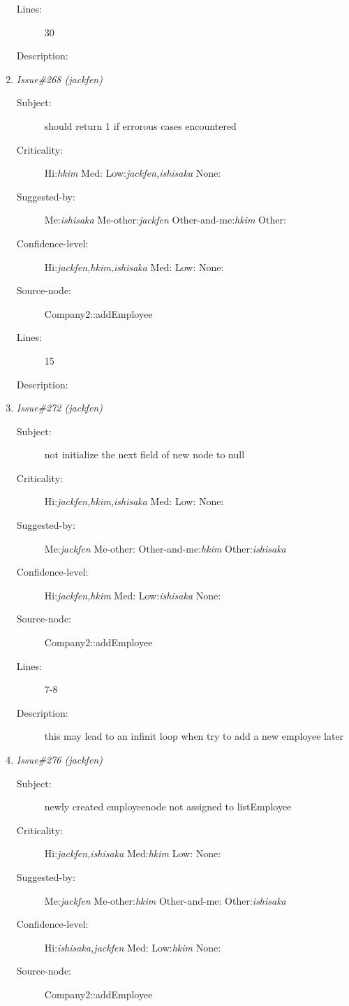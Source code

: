 \begin{enumerate}
\begin{description}
\item [Lines:] 30

\item [Description:] 
\end{description}
\item {\it Issue\#268 (jackfen)}
\begin{description}
\item [Subject:] should return 1 if errorous cases encountered
\item [Criticality:] Hi:{\it hkim} Med:{\it } Low:{\it jackfen,ishisaka} None:{\it }
\item [Suggested-by:] Me:{\it ishisaka} Me-other:{\it jackfen} Other-and-me:{\it hkim} Other:{\it }
\item [Confidence-level:] Hi:{\it jackfen,hkim,ishisaka} Med:{\it } Low:{\it } None:{\it }
\item [Source-node:] Company2::addEmployee

\item [Lines:] 15

\item [Description:] 
\end{description}
\item {\it Issue\#272 (jackfen)}
\begin{description}
\item [Subject:] not initialize the next field of new node to null
\item [Criticality:] Hi:{\it jackfen,hkim,ishisaka} Med:{\it } Low:{\it } None:{\it }
\item [Suggested-by:] Me:{\it jackfen} Me-other:{\it } Other-and-me:{\it hkim} Other:{\it ishisaka}
\item [Confidence-level:] Hi:{\it jackfen,hkim} Med:{\it } Low:{\it ishisaka} None:{\it }
\item [Source-node:] Company2::addEmployee

\item [Lines:] 7-8

\item [Description:] this may lead to an infinit loop when try to
add a new employee later
\end{description}
\item {\it Issue\#276 (jackfen)}
\begin{description}
\item [Subject:] newly created employeenode not assigned to listEmployee
\item [Criticality:] Hi:{\it jackfen,ishisaka} Med:{\it hkim} Low:{\it } None:{\it }
\item [Suggested-by:] Me:{\it jackfen} Me-other:{\it hkim} Other-and-me:{\it } Other:{\it ishisaka}
\item [Confidence-level:] Hi:{\it ishisaka,jackfen} Med:{\it } Low:{\it hkim} None:{\it }
\item [Source-node:] Company2::addEmployee


\end{description}
\end{enumerate}
